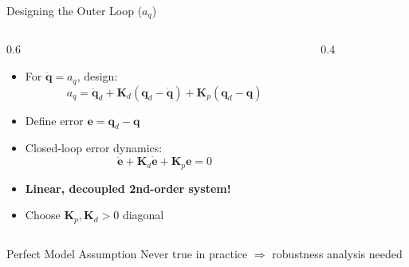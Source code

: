 \documentclass[10pt]{beamer}
\newcommand{\vect}[1]{\boldsymbol{#1}}
\newcommand{\q}{\vect{q}}
\newcommand{\qd}{\vect{q}_d}
\newcommand{\qdot}{\dot{\vect{q}}}
\newcommand{\qddot}{\ddot{\vect{q}}}
\newcommand{\Kp}{\vect{K}_p}
\newcommand{\Kd}{\vect{K}_d}
\begin{document}
\begin{frame}{Designing the Outer Loop ($a_q$)}
    \begin{columns}
        \begin{column}{0.6\textwidth}
            \begin{itemize}
                \item For $\qddot = a_q$, design:
                \[
                a_q = \qddot_d + \Kd(\qd - \qdot) + \Kp(\qd - \q)
                \]
                \item Define error $\vect{e} = \qd - \q$
                \item Closed-loop error dynamics:
                \[
                \ddot{\vect{e}} + \Kd\dot{\vect{e}} + \Kp\vect{e} = 0
                \]
                \item \textbf{Linear, decoupled 2nd-order system!}
                \item Choose $\Kp, \Kd > 0$ diagonal
            \end{itemize}
        \end{column}
        
        \begin{column}{0.4\textwidth}
            \begin{center}
            \end{center}
        \end{column}
    \end{columns}
    
    \vspace{5mm}
    \begin{alertblock}{Perfect Model Assumption}
        Never true in practice $\Rightarrow$ robustness analysis needed
    \end{alertblock}
\end{frame}
\end{document}
